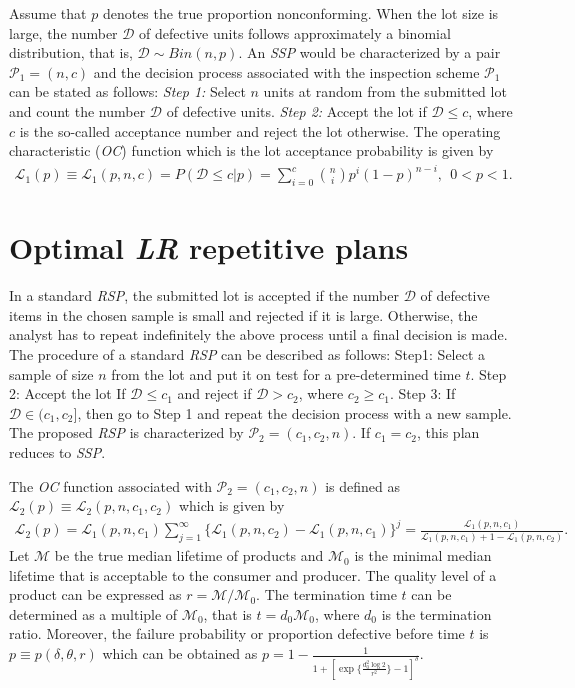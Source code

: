 \documentclass[twoside]{article}
\begin{document}
Assume that  $p$ denotes the true proportion nonconforming. When the lot size is large, 	the number $\mathcal{D}$ of defective units follows approximately a binomial distribution, that is, $\mathcal{D}\sim Bin(n,p)$.
%
An \textit{SSP} would be characterized by a pair $\mathcal{P}_1=(n,c)$ and the decision process associated with the inspection scheme $\mathcal{P}_1$ can be stated as follows: {\it Step 1:} Select $n$ units at random from the submitted lot and count the number $\mathcal{D}$ of defective units. \textit{Step 2:} Accept the lot if $\mathcal{D}\leq c$, where  $c$ is the so-called acceptance number and reject the lot otherwise.
%
The operating characteristic  (\textit{OC}) function which is the lot acceptance probability is given by
\begin{eqnarray}\label{LS}
\mathcal{L}_1(p)\equiv \mathcal{L}_1(p,n,c)=P(\mathcal{D}\leq c|p)=\sum_{i=0}^c {n \choose i} p^i(1-p)^{n-i},~~0<p<1.
\end{eqnarray}






\section{ Optimal \textit{LR} repetitive plans}
In a standard \textit{RSP}, the submitted lot is accepted if the number $\mathcal{D}$ of defective items in the chosen sample is small and rejected if it is large. Otherwise, the analyst has to repeat indefinitely the above process until a final decision is made. 
The procedure of a standard \textit{RSP} can be described as follows: Step1: Select a sample of size $n$ from the lot and put it on test for a pre-determined  time $t$.
Step 2: Accept the lot  If $\mathcal{D}\leq c_1$ and reject if $\mathcal{D}>c_2$, where $c_2\geq c_1$.
Step 3: If $\mathcal{D}\in(c_1,c_2]$, then go to Step 1 and repeat the decision process with a new sample.
%
%
The proposed  \textit{RSP}   is characterized by $\mathcal{P}_2=(c_1, c_2, n)$. If $c_1=c_2$, this plan reduces to \textit{SSP}.
%

The \textit{OC} function associated with $\mathcal{P}_2=(c_1, c_2, n)$ is defined as $\mathcal{L}_2(p)\equiv \mathcal{L}_2(p,n,c_1,c_2)$ which is given by
\begin{eqnarray}\label {oc}
\mathcal{L}_2(p)=\mathcal{L}_1(p,n,c_1)\sum_{j=1}^{\infty}\{\mathcal{L}_1(p,n,c_2)-\mathcal{L}_1(p,n,c_1)\}^j=\frac{\mathcal{L}_1(p,n,c_1)}{\mathcal{L}_1(p,n,c_1)+1-\mathcal{L}_1(p,n,c_2)}.
\end{eqnarray}
%
Let $\mathcal{M}$ be the true median lifetime of products and $\mathcal{M}_0$ is the minimal median lifetime that is acceptable to the consumer and producer. The quality level of a product  can be expressed as $r=\mathcal{M}/\mathcal{M}_0$.  The  termination time $t$ can be determined as a multiple of $\mathcal{M}_0$, that is  $t=d_0\mathcal{M}_0$, where $d_0$ is the termination ratio.
Moreover, the failure probability or proportion defective before time $t$ is $p\equiv p(\delta,\theta,r)$ which can be obtained as
$p=1-\frac{1}{1+[\exp\{{\frac{d_0^2\log 2}{r^2}}\}-1]^{\delta}}$.
%
%
\end{document}
